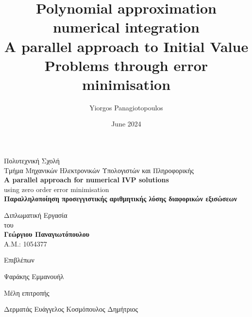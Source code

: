 \documentclass[11pt]{report}
\title{Polynomial approximation numerical integration\\ \large{A parallel approach to Initial Value Problems through error minimisation}}
\author{Yiorgos Panagiotopoulos}
\date{June 2024}
\begin{document}
    \begin{titlepage}
        \begin{center}

            \vspace{0.5cm}

            \textgreek{\LARGE{
                Πολυτεχνική Σχολή}
            \\
            \Large{
                Τμήμα Μηχανικών Ηλεκτρονικών Υπολογιστών και Πληροφορικής
            }}
            \\
            \vspace{1cm}
            \Huge{\textbf{
                A parallel approach for numerical IVP solutions }
            }
            \\
            \LARGE{
                using zero order error minimisation
            }
            \\
            \vspace{1cm}
            \textgreek{
                \Large{
                    \textbf{Παραλληλοποίηση προσεγγιστικής αριθμητικής λύσης διαφορικών εξισώσεων}
                }
            }
            \vspace{1cm}
            \\
            \normalsize{
                \textgreek{Διπλωματική Εργασία
                \\
                του
                \\
                \textbf{\large{Γεώργιου Παναγιωτόπουλου}}
                \\
                A.M.: 1054377
                \\
                \vspace{1cm}
                }

                \normalsize{
                    Επιβλέπων
                    \vspace{-0.3cm}
                    \begin{center}
                        Ψαράκης Εμμανουήλ
                    \end{center}
                    Μέλη επιτροπής
                    \vspace{-0.3cm}
                    \begin{center}
                        Δερματάς Ευάγγελος \hspace{1cm} Κοσμόπουλος Δημήτριος
                    \end{center}
                }

}
\end{center}
\end{titlepage}
\end{document}
